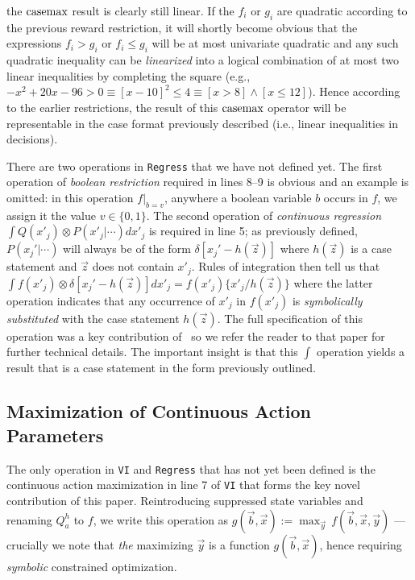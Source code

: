 the $\mathrm{casemax}$ result is clearly still linear.  If the $f_i$ or $g_i$
are quadratic according to the previous reward restriction, it will
shortly become obvious that the expressions $f_i > g_i$ or $f_i \leq
g_i$ will be at most univariate quadratic and any such quadratic
inequality can be \emph{linearized} into a logical combination of at most 
two linear inequalities by completing the square (e.g., 
$-x^2 + 20x - 96 > 0 \equiv [x - 10]^2 \leq 4 \equiv [x > 8] \land [x \leq 12]$).  Hence
according to the earlier restrictions, the result of this $\mathrm{casemax}$
operator will be representable in the case format previously described
(i.e., linear inequalities in decisions).

There are two operations in \texttt{Regress} that we have not defined
yet.  The first operation of \emph{boolean restriction} required in
lines 8--9 is obvious and an example is omitted: in this operation
$f|_{b=v}$, anywhere a boolean variable $b$ occurs in $f$, we assign
it the value $v \in \{ 0,1 \}$.  The second operation of
\emph{continuous regression} $\int Q(x'_j) \otimes P(x'_j|\cdots)
dx'_j$ is required in line 5; as previously defined, $P(x_j'|\cdots)$
will always be of the form $\delta[x_j' - h(\vec{z})]$ where
$h(\vec{z})$ is a case statement and $\vec{z}$ does not contain
$x'_j$.  Rules of integration then tell us that $\int f(x'_j) \otimes
\delta[x_j' - h(\vec{z})] dx'_j = f(x'_j) \{ x'_j / h(\vec{z}) \}$
where the latter operation indicates that any occurrence of $x'_j$ in
$f(x'_j)$ is \emph{symbolically substituted} with the case statement
$h(\vec{z})$.  The full specification of this operation was a key
contribution of~\cite{sanner_uai11} so we refer the reader to that
paper for further technical details.  The
important insight is that this $\int$ operation yields a result that is a
case statement in the form previously outlined.

\subsection{Maximization of Continuous Action Parameters}

The only operation in \texttt{VI} and \texttt{Regress} that has not
yet been defined is the continuous action maximization in line 7 of
\texttt{VI} that forms the key novel contribution of this paper.
Reintroducing suppressed state variables and renaming $Q_a^{h}$ to
$f$, we write this operation as $g(\vec{b},\vec{x}) := \max_{\vec{y}}
\, f(\vec{b},\vec{x},\vec{y})$ --- crucially we note that 
\emph{the} maximizing $\vec{y}$ is a function
$g(\vec{b},\vec{x})$, hence requiring \emph{symbolic} 
constrained optimization.

